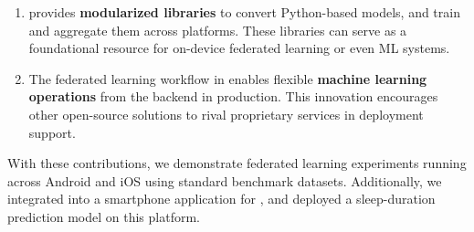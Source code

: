 \begin{enumerate}
    \item \fedkit provides \textbf{modularized libraries} to convert Python-based models,
          and train and aggregate them across platforms.
          These libraries can serve as a foundational resource for
          on-device federated learning or even ML systems.
    \item The federated learning workflow in \fedkit
          enables flexible \textbf{machine learning operations} from
          the backend in production.
          This innovation encourages other open-source solutions to
          rival proprietary services in deployment support.
\end{enumerate}

With these contributions,
we demonstrate federated learning experiments running across Android and iOS
using standard benchmark datasets. Additionally,
we integrated \fedkit into a smartphone application for \fedcampus,
and deployed a sleep-duration prediction model on this platform.
